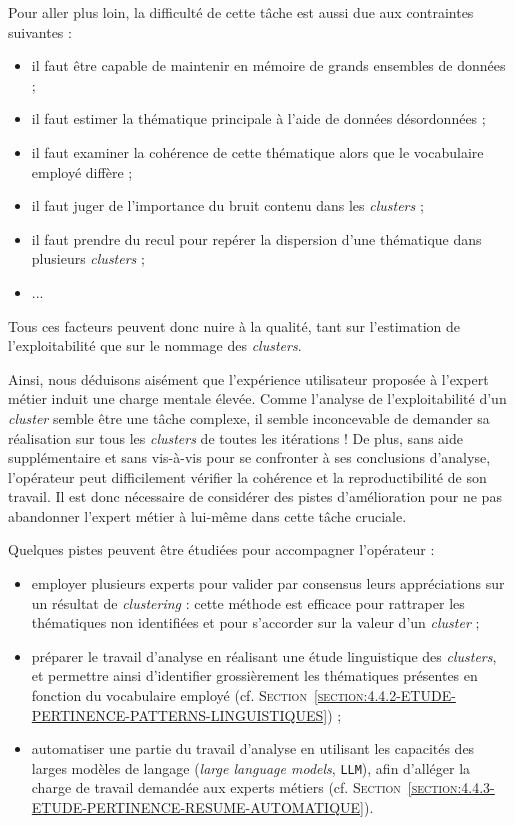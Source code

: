 			Pour aller plus loin, la difficulté de cette tâche est aussi due aux contraintes suivantes :
			\begin{itemize}
				\item il faut être capable de maintenir en mémoire de grands ensembles de données ;
				\item il faut estimer la thématique principale à l'aide de données désordonnées ;
				\item il faut examiner la cohérence de cette thématique alors que le vocabulaire employé diffère ;
				\item il faut juger de l'importance du bruit contenu dans les \textit{clusters} ;
				\item il faut prendre du recul pour repérer la dispersion d'une thématique dans plusieurs \textit{clusters} ;
				\item ...
			\end{itemize}
			Tous ces facteurs peuvent donc nuire à la qualité, tant sur l'estimation de l'exploitabilité que sur le nommage des \textit{clusters}.
			
			Ainsi, nous déduisons aisément que l'expérience utilisateur proposée à l'expert métier induit une charge mentale élevée.
			Comme l'analyse de l'exploitabilité d'un \textit{cluster} semble être une tâche complexe, il semble inconcevable de demander sa réalisation sur tous les \textit{clusters} de toutes les itérations !
			De plus, sans aide supplémentaire et sans vis-à-vis pour se confronter à ses conclusions d'analyse, l'opérateur peut difficilement vérifier la cohérence et la reproductibilité de son travail.
			Il est donc nécessaire de considérer des pistes d'amélioration pour ne pas abandonner l'expert métier à lui-même dans cette tâche cruciale.
			
			Quelques pistes peuvent être étudiées pour accompagner l'opérateur :
			\begin{itemize}
				\item employer plusieurs experts pour valider par consensus leurs appréciations sur un résultat de \textit{clustering} : cette méthode est efficace pour rattraper les thématiques non identifiées et pour s'accorder sur la valeur d'un \textit{cluster} ;
				\item préparer le travail d'analyse en réalisant une étude linguistique des \textit{clusters}, et permettre ainsi d'identifier grossièrement les thématiques présentes en fonction du vocabulaire employé (cf. \textsc{Section~\ref{section:4.4.2-ETUDE-PERTINENCE-PATTERNS-LINGUISTIQUES}}) ;
				\item automatiser une partie du travail d'analyse en utilisant les capacités des larges modèles de langage (\textit{large language models}, \texttt{LLM}), afin d'alléger la charge de travail demandée aux experts métiers (cf. \textsc{Section~\ref{section:4.4.3-ETUDE-PERTINENCE-RESUME-AUTOMATIQUE}}).
			\end{itemize}
	
